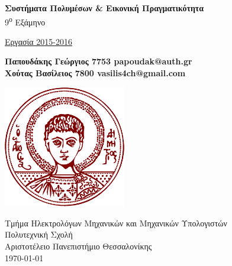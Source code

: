 \documentclass[12pt]{report}
\begin{document}
\setcounter{tocdepth}{3}

\begin{titlepage}
    \begin{center}
        \vspace*{1cm}

        \Large
        \textbf{Συστήματα Πολυμέσων \& Εικονική Πραγματικότητα}\\

        \large 9\textsuperscript{ο} Εξάμηνο


        \vspace*{0.5cm}

        \Huge
        \uline{Εργασία 2015-2016}\\

        \vspace{1.5cm}

        \large
        \textbf{Παπουδάκης Γεώργιος 7753 papoudak@auth.gr\\
          Χούτας Βασίλειος 7800 vasilis4ch@gmail.com}\\

        \vfill

        \vspace{0.8cm}

        \includegraphics[width=0.4\textwidth]{university}

        \vspace{0.8cm}

        \smallskip
        Τμήμα Ηλεκτρολόγων Μηχανικών και Μηχανικών Υπολογιστών\\
        Πολυτεχνική Σχολή
        \smallskip
        \\Αριστοτέλειο Πανεπιστήμιο Θεσσαλονίκης\\
        \today

    \end{center}
\end{titlepage}

\thispagestyle{empty}
\newpage

\tableofcontents
\listoftables
\listoffigures
\newpage







\end{document}
